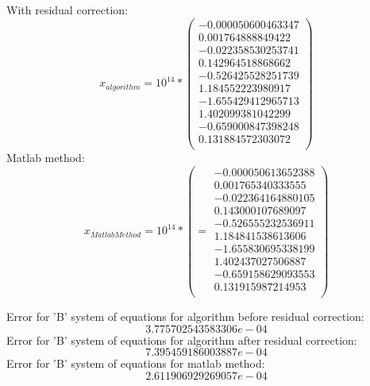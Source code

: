 \documentclass[12pt]{report}
\begin{document}
With residual correction:
\[ x_{algorithm} = 10^{14} * \left(\begin{array}{cc}
-0.000050600463347 \\
 0.001764888849422 \\
-0.022358530253741 \\
 0.142964518868662 \\
-0.526425528251739 \\
 1.184552223980917 \\
-1.655429412965713 \\
 1.402099381042299 \\
-0.659000847398248 \\
 0.131884572303072 \\
\end{array} \right)
\]
Matlab method:
\[
x_{Matlab Method} = 10^{14} * \left(  = \begin{array}{cc}
-0.000050613652388 \\
0.001765340333555 \\
-0.022364164880105 \\
0.143000107689097 \\
-0.526555232536911 \\
1.184841538613606 \\
-1.655830695338199 \\
1.402437027506887 \\
-0.659158629093553 \\
0.131915987214953 \\
\end{array} \right)
\]

Error for 'B' system of equations for algorithm before residual correction: \[ 3.775702543583306e-04 \]
Error for 'B' system of equations for algorithm after residual correction: \[ 7.395459186003887e-04 \]
Error for 'B' system of equations for matlab method: \[ 2.611906929269057e-04 \]
\end{document}
